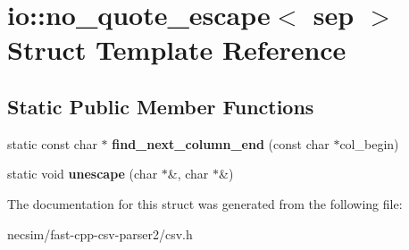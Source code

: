 \hypertarget{structio_1_1no__quote__escape}{}\section{io\+:\+:no\+\_\+quote\+\_\+escape$<$ sep $>$ Struct Template Reference}
\label{structio_1_1no__quote__escape}
\subsection*{Static Public Member Functions}
\begin{DoxyCompactItemize}
\item 
static const char $\ast$ {\bfseries find\+\_\+next\+\_\+column\+\_\+end} (const char $\ast$col\+\_\+begin)\hypertarget{structio_1_1no__quote__escape_add17b043bb89445079a0448026ce86d0}{}\label{structio_1_1no__quote__escape_add17b043bb89445079a0448026ce86d0}

\item 
static void {\bfseries unescape} (char $\ast$\&, char $\ast$\&)\hypertarget{structio_1_1no__quote__escape_af1c217f2c995d178a91c58235191b052}{}\label{structio_1_1no__quote__escape_af1c217f2c995d178a91c58235191b052}

\end{DoxyCompactItemize}


The documentation for this struct was generated from the following file\+:\begin{DoxyCompactItemize}
\item 
necsim/fast-\/cpp-\/csv-\/parser2/csv.\+h\end{DoxyCompactItemize}
